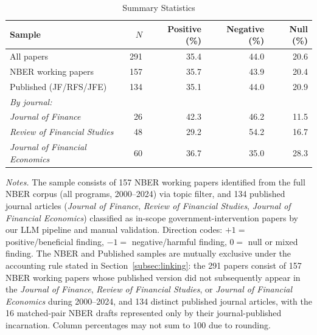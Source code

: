 \documentclass[12pt]{article}
\newcommand{\JF}{\textit{Journal of Finance}}
\newcommand{\RFS}{\textit{Review of Financial Studies}}
\newcommand{\JFE}{\textit{Journal of Financial Economics}}
\begin{document}
\begin{table}[H]
\centering
\caption{Summary Statistics}
\label{tab:summary}
\begin{singlespace}
\small
\begin{tabular}{lrrrr}
\toprule
Sample & $N$ & Positive (\%) & Negative (\%) & Null (\%) \\
\midrule
All papers                   & 291 & 35.4 & 44.0 & 20.6 \\
\quad NBER working papers    & 157 & 35.7 & 43.9 & 20.4 \\
\quad Published (JF/RFS/JFE) & 134 & 35.1 & 44.0 & 20.9 \\
\midrule
\multicolumn{5}{l}{\textit{By journal:}} \\
\quad \JF{}  &  26 & 42.3 & 46.2 & 11.5 \\
\quad \RFS{} &  48 & 29.2 & 54.2 & 16.7 \\
\quad \JFE{} &  60 & 36.7 & 35.0 & 28.3 \\
\bottomrule
\end{tabular}
\par\smallskip
\begin{minipage}{\textwidth}
\small
\textit{Notes.} The sample consists of 157 NBER working papers identified
from the full NBER corpus (all programs, 2000--2024) via topic filter, and 134 published journal articles
(\JF{}, \RFS{}, \JFE{}) classified as in-scope government-intervention papers
by our LLM pipeline and manual validation.  Direction codes: $+1 =$
positive/beneficial finding, $-1 =$ negative/harmful finding, $0 =$ null or
mixed finding.  The NBER and Published samples are mutually exclusive under the
accounting rule stated in Section~\ref{subsec:linking}: the 291 papers
consist of 157 NBER working papers whose published version did not
subsequently appear in the \JF{}, \RFS{}, or \JFE{} during 2000--2024,
and 134 distinct published journal articles, with the 16 matched-pair
NBER drafts represented only by their journal-published incarnation.
Column percentages may not sum to 100 due to rounding.
\end{minipage}
\end{singlespace}
\end{table}
\end{document}
